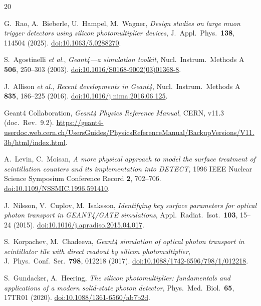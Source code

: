 \documentclass[11pt,a4paper]{article}
\begin{document}
\begin{thebibliography}{20}

G.~Rao, A.~Bieberle, U.~Hampel, M.~Wagner,
\emph{Design studies on large muon trigger detectors using silicon photomultiplier devices},
J.~Appl.\ Phys.\ \textbf{138}, 114504 (2025).
\href{https://doi.org/10.1063/5.0288270}{doi:10.1063/5.0288270}.

S.~Agostinelli \emph{et al.},
\emph{Geant4---a simulation toolkit},
Nucl.\ Instrum.\ Methods A \textbf{506}, 250--303 (2003).
\href{https://doi.org/10.1016/S0168-9002(03)01368-8}{doi:10.1016/S0168-9002(03)01368-8}.

J.~Allison \emph{et al.},
\emph{Recent developments in Geant4},
Nucl.\ Instrum.\ Methods A \textbf{835}, 186--225 (2016).
\href{https://doi.org/10.1016/j.nima.2016.06.125}{doi:10.1016/j.nima.2016.06.125}.

Geant4 Collaboration,
\emph{Geant4 Physics Reference Manual}, CERN, v11.3 (doc.\ Rev.\ 9.2).
\url{https://geant4-userdoc.web.cern.ch/UsersGuides/PhysicsReferenceManual/BackupVersions/V11.3b/html/index.html}.

A.~Levin, C.~Moisan,
\emph{A more physical approach to model the surface treatment of scintillation
counters and its implementation into DETECT},
1996 IEEE Nuclear Science Symposium Conference Record \textbf{2}, 702--706.
\href{https://doi.org/10.1109/NSSMIC.1996.591410}{doi:10.1109/NSSMIC.1996.591410}.

J.~Nilsson, V.~Cuplov, M.~Isaksson,
\emph{Identifying key surface parameters for optical photon transport in
GEANT4/GATE simulations},
Appl.\ Radiat.\ Isot.\ \textbf{103}, 15--24 (2015).
\href{https://doi.org/10.1016/j.apradiso.2015.04.017}{doi:10.1016/j.apradiso.2015.04.017}.

S.~Korpachev, M.~Chadeeva,
\emph{Geant4 simulation of optical photon transport in scintillator tile with
direct readout by silicon photomultiplier},
J.\ Phys.\ Conf.\ Ser.\ \textbf{798}, 012218 (2017).
\href{https://doi.org/10.1088/1742-6596/798/1/012218}{doi:10.1088/1742-6596/798/1/012218}.

S.~Gundacker, A.~Heering,
\emph{The silicon photomultiplier: fundamentals and applications of a modern
solid-state photon detector},
Phys.\ Med.\ Biol.\ \textbf{65}, 17TR01 (2020).
\href{https://doi.org/10.1088/1361-6560/ab7b2d}{doi:10.1088/1361-6560/ab7b2d}.


\end{thebibliography}
\end{document}
